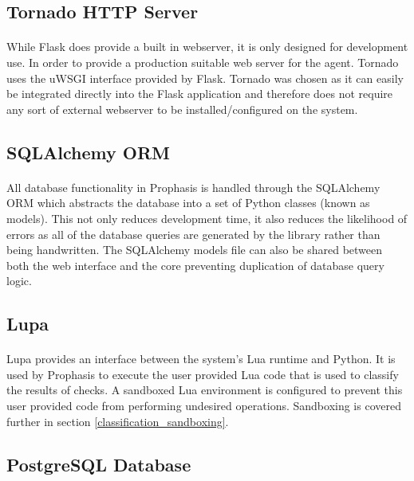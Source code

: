 \documentclass[bsc,logo,twoside]{infthesis}
\begin{document}
\subsection{Tornado HTTP Server}
\paragraph*{}
	While Flask does provide a built in webserver, it is only designed for
	development	use.  In order to provide a production suitable web server for the
	agent.  Tornado uses the uWSGI interface provided by Flask.  Tornado was chosen
	as it can easily be integrated directly into the Flask application and
	therefore does not require any sort of external webserver to be
	installed/configured on the system.

\subsection{SQLAlchemy ORM}
\paragraph*{}
	All database functionality in Prophasis is handled through the SQLAlchemy ORM
	which abstracts the database into a set of Python classes (known as models).
	This not only reduces development time, it also reduces the likelihood of
	errors as all of the database queries are generated by the library rather than
	being handwritten.  The SQLAlchemy models file can also be shared between both
	the web interface and the core preventing duplication of database query logic.

\subsection{Lupa}
\paragraph*{}
	Lupa provides an interface between the system's Lua runtime and Python.  It is
	used by Prophasis to execute the user provided Lua code that is used to
	classify the results of checks. A sandboxed Lua environment is configured to
	prevent this user provided code from performing undesired operations.
	Sandboxing is covered further in section \ref{classification_sandboxing}.

\subsection{PostgreSQL Database}
\end{document}
